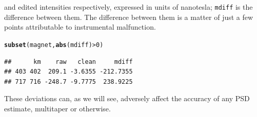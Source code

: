 \documentclass[10pt]{article}\usepackage[]{graphicx}\usepackage[]{color}
\makeatletter
\newcommand{\hlnum}[1]{\textcolor[rgb]{0.686,0.059,0.569}{#1}}%
\newcommand{\hlopt}[1]{\textcolor[rgb]{0,0,0}{#1}}%
\newcommand{\hlstd}[1]{\textcolor[rgb]{0.345,0.345,0.345}{#1}}%
\newcommand{\hlkwd}[1]{\textcolor[rgb]{0.737,0.353,0.396}{\textbf{#1}}}%
\newenvironment{kframe}{%
 \def\at@end@of@kframe{}%
 \ifinner\ifhmode%
  \def\at@end@of@kframe{\end{minipage}}%
  \begin{minipage}{\columnwidth}%
 \fi\fi%
 \def\FrameCommand##1{\hskip\@totalleftmargin \hskip-\fboxsep
 \colorbox{shadecolor}{##1}\hskip-\fboxsep
     \hskip-\linewidth \hskip-\@totalleftmargin \hskip\columnwidth}%
 \MakeFramed {\advance\hsize-\width
   \@totalleftmargin\z@ \linewidth\hsize
   \@setminipage}}%
 {\par\unskip\endMakeFramed%
 \at@end@of@kframe}
\newenvironment{knitrout}{}{} %
\newcommand{\Rcmd}[1]{\texttt{#1}}
\makeatother
\begin{document}
and edited intensities respectively, expressed in units of nanotesla; 
\Rcmd{mdiff} is the difference between them.
The difference between them is a matter of just a few points
attributable to instrumental malfunction. 
\begin{knitrout}\small
{}\color{fgcolor}\begin{kframe}
\begin{alltt}
\hlkwd{subset}\hlstd{(magnet,} \hlkwd{abs}\hlstd{(mdiff)} \hlopt{>} \hlnum{0}\hlstd{)}
\end{alltt}
\begin{verbatim}
##      km    raw   clean     mdiff
## 403 402  209.1 -3.6355 -212.7355
## 717 716 -248.7 -9.7775  238.9225
\end{verbatim}
\end{kframe}
\end{knitrout}
These deviations can,
as we will see, adversely affect the accuracy of any PSD estimate,
multitaper or otherwise.
\end{document}
